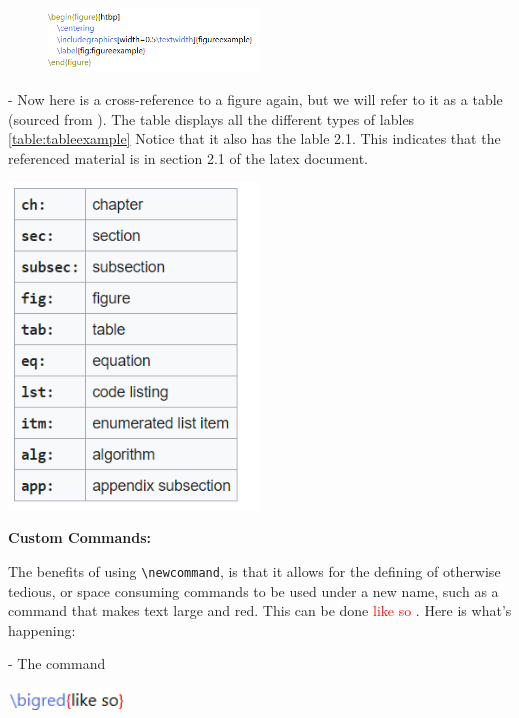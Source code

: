 \documentclass[a4paper, 11pt]{report}
\begin{document}
\begin{figure}[htbp]
    \centering
    \includegraphics[width=0.5\textwidth]{figureexample}
    \label{fig:figureexample}
\end{figure}

- Now here is a cross-reference to a figure again, but we will refer to it as a table (sourced from \cite{labletypes}). The table displays all the different types of lables \ref{table:tableexample} Notice that it also has the lable 2.1. This indicates that the referenced material is in section 2.1 of the latex document.
 
\begin{table}[htbp]
    \centering
    \includegraphics[width=0.5\textwidth]{tableexample}
    \label{table:tableexample}
\end{table}

\vspace{\baselineskip}
 \textbf{Custom Commands:}

\newcommand{\bigred}[1]{
	\textcolor{red}{\large #1}
}

The benefits of using \verb|\newcommand|, is that it allows for the defining of otherwise tedious, or space consuming commands to be used under a new name, such as a command that makes text large and red. This can be done \bigred{like so}. Here is what's happening:

- The command

 \includegraphics[width=0.23\textwidth]{mycommand}
\end{document}
